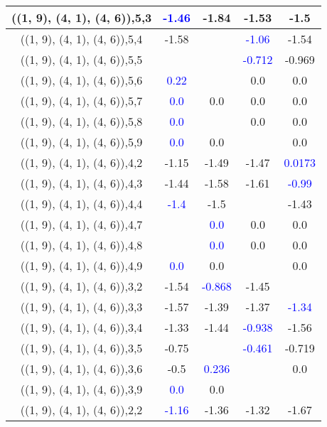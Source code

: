 \documentclass{article}
\begin{document}
\begin{center}
\begin{longtable}{|c|c|c|c|c|}
        	\hline
        	((1, 9), (4, 1), (4, 6)),5,3& \textcolor{blue}{-1.46}&-1.84&-1.53&-1.5\\
        	\hline
        	((1, 9), (4, 1), (4, 6)),5,4&-1.58&& \textcolor{blue}{-1.06}&-1.54\\
        	\hline
        	((1, 9), (4, 1), (4, 6)),5,5&&& \textcolor{blue}{-0.712}&-0.969\\
        	\hline
        	((1, 9), (4, 1), (4, 6)),5,6& \textcolor{blue}{0.22}&&0.0&0.0\\
        	\hline
        	((1, 9), (4, 1), (4, 6)),5,7& \textcolor{blue}{0.0}&0.0&0.0&0.0\\
        	\hline
        	((1, 9), (4, 1), (4, 6)),5,8& \textcolor{blue}{0.0}&&0.0&0.0\\
        	\hline
        	((1, 9), (4, 1), (4, 6)),5,9& \textcolor{blue}{0.0}&0.0&&0.0\\
        	\hline
        	((1, 9), (4, 1), (4, 6)),4,2&-1.15&-1.49&-1.47& \textcolor{blue}{0.0173}\\
        	\hline
        	((1, 9), (4, 1), (4, 6)),4,3&-1.44&-1.58&-1.61& \textcolor{blue}{-0.99}\\
        	\hline
        	((1, 9), (4, 1), (4, 6)),4,4& \textcolor{blue}{-1.4}&-1.5&&-1.43\\
        	\hline
        	((1, 9), (4, 1), (4, 6)),4,7&& \textcolor{blue}{0.0}&0.0&0.0\\
        	\hline
        	((1, 9), (4, 1), (4, 6)),4,8&& \textcolor{blue}{0.0}&0.0&0.0\\
        	\hline
        	((1, 9), (4, 1), (4, 6)),4,9& \textcolor{blue}{0.0}&0.0&&0.0\\
        	\hline
        	((1, 9), (4, 1), (4, 6)),3,2&-1.54& \textcolor{blue}{-0.868}&-1.45&\\
        	\hline
        	((1, 9), (4, 1), (4, 6)),3,3&-1.57&-1.39&-1.37& \textcolor{blue}{-1.34}\\
        	\hline
        	((1, 9), (4, 1), (4, 6)),3,4&-1.33&-1.44& \textcolor{blue}{-0.938}&-1.56\\
        	\hline
        	((1, 9), (4, 1), (4, 6)),3,5&-0.75&& \textcolor{blue}{-0.461}&-0.719\\
        	\hline
        	((1, 9), (4, 1), (4, 6)),3,6&-0.5& \textcolor{blue}{0.236}&&0.0\\
        	\hline
        	((1, 9), (4, 1), (4, 6)),3,9& \textcolor{blue}{0.0}&0.0&&\\
        	\hline
        	((1, 9), (4, 1), (4, 6)),2,2& \textcolor{blue}{-1.16}&-1.36&-1.32&-1.67\\

\end{longtable}
\end{center}
\end{document}

